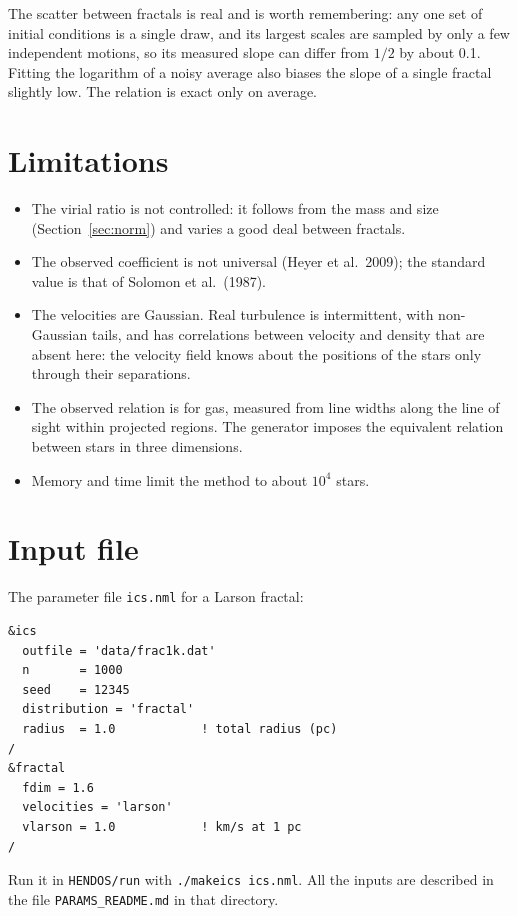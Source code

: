 \documentclass[11pt,a4paper]{article}
\begin{document}
The scatter between fractals is real and is worth remembering: any one
set of initial conditions is a single draw, and its largest scales are
sampled by only a few independent motions, so its measured slope can
differ from $1/2$ by about 0.1. Fitting the logarithm of a noisy
average also biases the slope of a single fractal slightly low. The
relation is exact only on average.

\section{Limitations}

\begin{itemize}
\item The virial ratio is not controlled: it follows from the mass and
  size (Section~\ref{sec:norm}) and varies a good deal between fractals.
\item The observed coefficient is not universal (Heyer et al.\ 2009); the
  standard value is that of Solomon et al.\ (1987).
\item The velocities are Gaussian. Real turbulence is intermittent, with
  non-Gaussian tails, and has correlations between velocity and density
  that are absent here: the velocity field knows about the positions of
  the stars only through their separations.
\item The observed relation is for gas, measured from line widths along
  the line of sight within projected regions. The generator imposes the
  equivalent relation between stars in three dimensions.
\item Memory and time limit the method to about $10^4$ stars.
\end{itemize}

\section{Input file}

The parameter file \texttt{ics.nml} for a Larson fractal:
\begin{lstlisting}
&ics
  outfile = 'data/frac1k.dat'
  n       = 1000
  seed    = 12345
  distribution = 'fractal'
  radius  = 1.0            ! total radius (pc)
/
&fractal
  fdim = 1.6
  velocities = 'larson'
  vlarson = 1.0            ! km/s at 1 pc
/
\end{lstlisting}
Run it in \texttt{HENDOS/run} with \texttt{./makeics ics.nml}. All the
inputs are described in the file \texttt{PARAMS\_README.md} in that
directory.
\end{document}
